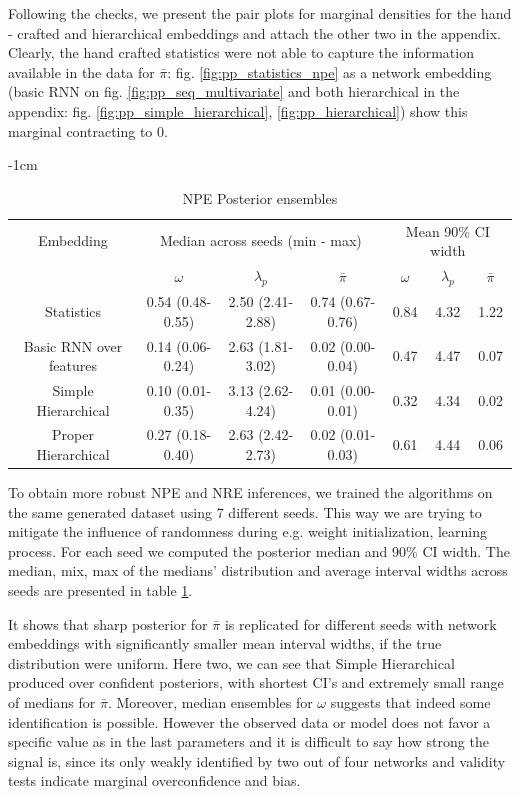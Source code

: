 \documentclass[12pt]{article}
\begin{document}
Following the checks, we present the pair plots for marginal densities for the hand - crafted and hierarchical embeddings and attach the other two in the appendix. Clearly, the hand crafted statistics were not able to capture the information available in the data for $\bar{\pi}$: fig. \ref{fig:pp_statistics_npe} as a network embedding (basic RNN on fig. \ref{fig:pp_seq_multivariate} and both hierarchical in the appendix: fig. \ref{fig:pp_simple_hierarchical}, \ref{fig:pp_hierarchical}) show this marginal contracting to 0. 
\begin{table}[ht]
    \centering
    \addtolength{\leftskip} {-1cm} %
    \addtolength{\rightskip}{-1cm}
    \begin{tabular}{|c|c c c|c c c|}
        \hline
         Embedding & 
         \multicolumn{3}{|c|}{Median across seeds (min - max)} &  \multicolumn{3}{|c|}{Mean 90\% CI width} \\
         & $\omega$ & $\lambda_p$ & $\bar{\pi}$ & $\omega$ & $\lambda_p$ & $\bar{\pi}$ \\
         \hline
         Statistics & 0.54 (0.48-0.55) & 2.50 (2.41-2.88) & 0.74 (0.67-0.76) & 0.84 & 4.32 & 1.22\\
         Basic RNN over features & 0.14 (0.06-0.24) & 2.63 (1.81-3.02) & 0.02 (0.00-0.04) & 0.47 & 4.47 & 0.07 \\
         Simple Hierarchical & 0.10 (0.01-0.35) & 3.13 (2.62-4.24) & 0.01 (0.00-0.01) & 0.32 & 4.34 & 0.02  \\
         Proper Hierarchical & 0.27 (0.18-0.40) & 2.63 (2.42-2.73) & 0.02 (0.01-0.03) & 0.61 & 4.44 & 0.06\\
         \hline \hline
    \end{tabular}
    \caption{NPE Posterior ensembles}
    \label{tab:seed_ensembles}
\end{table}

To obtain more robust NPE and NRE inferences, we trained the algorithms on the same generated dataset using 7 different seeds. This way we are trying to mitigate the influence of randomness during e.g. weight initialization, learning process. For each seed we computed the posterior median and 90\% CI width. The median, mix, max of the medians' distribution and average interval widths across seeds are presented in table \ref{tab:seed_ensembles}. 

It shows that sharp posterior for $\bar{\pi}$ is replicated for different seeds with network embeddings with significantly smaller mean interval widths, if the true distribution were uniform. Here two, we can see that Simple Hierarchical produced over confident posteriors, with shortest CI's and extremely small range of medians for $\bar{\pi}$. Moreover, median ensembles for $\omega$ suggests that indeed some identification is possible. However the observed data or model does not favor a specific value as in the last parameters and it is difficult to say how strong the signal is, since its only weakly identified by two out of four networks and validity tests indicate marginal overconfidence and bias. 
\end{document}
